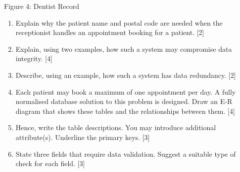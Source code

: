 \noindent{}
\noindent \begin{center}
Figure 4: Dentist Record
\par\end{center}
\begin{enumerate}
\item Explain why the patient name and postal code are needed when the receptionist
handles an appointment booking for a patient. \hfill{}{[}2{]}
\item Explain, using two examples, how such a system may compromise data
integrity. \hfill{}{[}4{]}
\item Describe, using an example, how such a system has data redundancy.
\hfill{}{[}2{]}
\item Each patient may book a maximum of one appointment per day. A fully
normalised database solution to this problem is designed. Draw an
E-R diagram that shows these tables and the relationships between
them. \hfill{}{[}4{]}
\item Hence, write the table descriptions. You may introduce additional
attribute(s). Underline the primary keys.\hfill{} {[}3{]}
\item State three fields that require data validation. Suggest a suitable
type of check for each field. \hfill{}{[}3{]}
\end{enumerate}